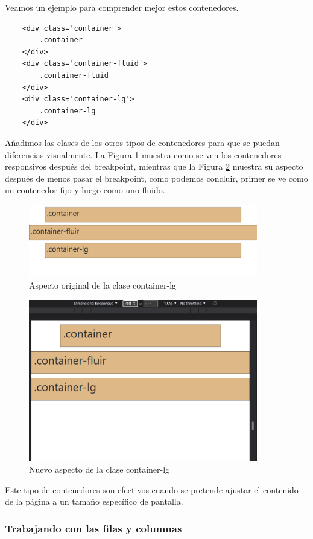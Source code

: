 Veamos un ejemplo para comprender mejor estos contenedores.
\begin{lstlisting}
    <div class='container'>
        .container
    </div>
    <div class='container-fluid'>
        .container-fluid
    </div>
    <div class='container-lg'>
        .container-lg
    </div>
\end{lstlisting}

Añadimos las clases de los otros tipos de contenedores para que se puedan diferencias visualmente. La Figura \ref{fig:14} muestra como se ven los contenedores responsivos después del breakpoint, mientras que la Figura \ref{fig:15} muestra su aspecto después de menos pasar el breakpoint, como podemos concluir, primer se ve como un contenedor fijo y luego como uno fluido.
\begin{figure}[H]
    \centering
    \caption{Aspecto original de la clase container-lg}
    \label{fig:14}
    \includegraphics[width=10cm]{ss/container-responsive.png}
\end{figure}
\begin{figure}[H]
    \centering
    \caption{Nuevo aspecto de la clase container-lg}
    \label{fig:15}
    \includegraphics[width=10cm]{ss/container-responsive2.png}
\end{figure}

Este tipo de contenedores son efectivos cuando se pretende ajustar el contenido de la página a un tamaño específico de pantalla.


\subsubsection{Trabajando con las filas y columnas}

